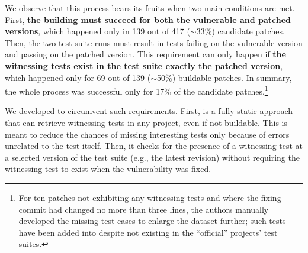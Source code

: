 We observe that this process bears its fruits when two main conditions are met.
First, \textbf{the building must succeed for both the vulnerable and patched versions}, which happened only in 139 out of 417 ($\sim$33\%) candidate patches.
Then, the two test suite runs must result in tests failing on the vulnerable version and passing on the patched version.
This requirement can only happen if \textbf{the witnessing tests exist in the test suite exactly the patched version}, which happened only for 69 out of 139 ($\sim$50\%) buildable patches.
In summary, the whole process was successful only for 17\% of the candidate patches.\footnote{
For ten patches not exhibiting any witnessing tests and where the fixing commit had changed no more than three lines, the authors manually developed the missing test cases to enlarge the dataset further; such tests have been added into \VulforJ despite not existing in the ``official'' projects' test suites.
}
%

We developed \vuteco to circumvent such requirements.
First, \vuteco is a fully static approach that can retrieve witnessing tests in any project, even if not buildable. This is meant to reduce the chances of missing interesting tests only because of errors unrelated to the test itself.
%
Then, it checks for the presence of a witnessing test at a selected version of the test suite (e.g., the latest revision) without requiring the witnessing test to exist when the vulnerability was fixed.
